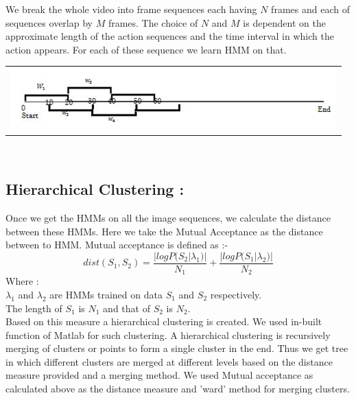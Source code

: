 \documentclass[a4paper, 10pt, notitlepage]{report}
\begin{document}
\begin{minipage}{0.4\textwidth}
\begin{flushleft} \large
We break the whole video into frame sequences each having $N$ frames and each of sequences overlap by $M$ frames. The choice of $N$ and $M$ is dependent on the approximate length of the action sequences and the time interval in which the action appears. For each of these sequence we learn HMM on that.

\end{flushleft}
\end{minipage}
\begin{minipage}{0.4\textwidth}
\begin{flushright} \large

\center
\begin{tabular}{c}
\includegraphics[scale=0.5]{interval.png}
\end{tabular}
\label{tab:gt}

\end{flushright}
\end{minipage}\\[3cm]

\subsection{Hierarchical Clustering :}
Once we get the HMMs on all the image sequences, we calculate the distance between these HMMs. Here we take the Mutual Acceptance as the distance between to HMM. Mutual acceptance is defined as :-\\

$$dist(S_1, S_2) = \frac{|logP(S_2|\lambda _ 1)|}{N_1} +\frac{|logP(S_1|\lambda _ 2)|}{N_2} $$
Where : \\
\hspace*{20pt} $\lambda_1$ and $\lambda_2$ are HMMs trained on data $S_1$ and $S_2$ respectively.\\
\hspace*{20pt} The length of $S_1$ is $N_1$ and that of $S_2$ is $N_2$.\\

Based on this measure a hierarchical clustering is created. We used in-built function of Matlab for such clustering. A hierarchical clustering is recursively merging of clusters or points to form a single cluster in the end. Thus we get tree in which different clusters are merged at different levels based on the distance measure provided and a merging method. We used Mutual acceptance as calculated above as the distance measure and 'ward' method for merging clusters.
\end{document}
